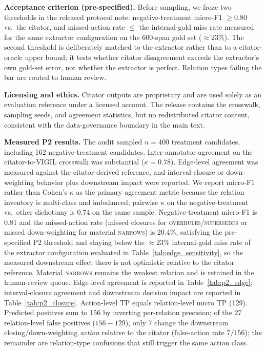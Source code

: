 \textbf{Acceptance criterion (pre-specified).} Before sampling, we froze two thresholds in the released protocol note: negative-treatment micro-F1 $\ge\!0.80$ vs.\ the citator, and missed-action rate $\le$ the internal-gold miss rate measured for the same extractor configuration on the 600-span gold set ($\approx$23\%). The second threshold is deliberately matched to the extractor rather than to a citator-oracle upper bound; it tests whether citator disagreement exceeds the extractor's own gold-set error, not whether the extractor is perfect. Relation types failing the bar are routed to human review.

\textbf{Licensing and ethics.} Citator outputs are proprietary and are used solely as an evaluation reference under a licensed account. The release contains the crosswalk, sampling seeds, and agreement statistics, but no redistributed citator content, consistent with the data-governance boundary in the main text.

\textbf{Measured P2 results.} The audit sampled $n\!=\!400$ treatment candidates, including 162 negative-treatment candidates. Inter-annotator agreement on the citator-to-VIGIL crosswalk was substantial ($\kappa=0.78$). Edge-level agreement was measured against the citator-derived reference, and interval-closure or down-weighting behavior plus downstream impact were reported. We report micro-F1 rather than Cohen's $\kappa$ as the primary agreement metric because the relation inventory is multi-class and imbalanced; pairwise $\kappa$ on the negative-treatment vs.\ other dichotomy is 0.74 on the same sample. Negative-treatment micro-F1 is 0.81 and the missed-action rate (missed closures for \textsc{overrules}/\textsc{supersedes} or missed down-weighting for material \textsc{narrows}) is 20.4\%, satisfying the pre-specified P2 threshold and staying below the $\approx$23\% internal-gold miss rate of the extractor configuration evaluated in Table~\ref{tab:edge_sensitivity}, so the measured downstream effect there is not optimistic relative to the citator reference. Material \textsc{narrows} remains the weakest relation and is retained in the human-review queue. Edge-level agreement is reported in Table~\ref{tab:p2_edge}; interval-closure agreement and downstream decision impact are reported in Table~\ref{tab:p2_closure}. Action-level TP equals relation-level micro TP (129). Predicted positives sum to 156 by inverting per-relation precision; of the 27 relation-level false positives ($156{-}129$), only 7 change the downstream closing/down-weighting \emph{action} relative to the citator (false-action rate $7/156$); the remainder are relation-type confusions that still trigger the same action class.

